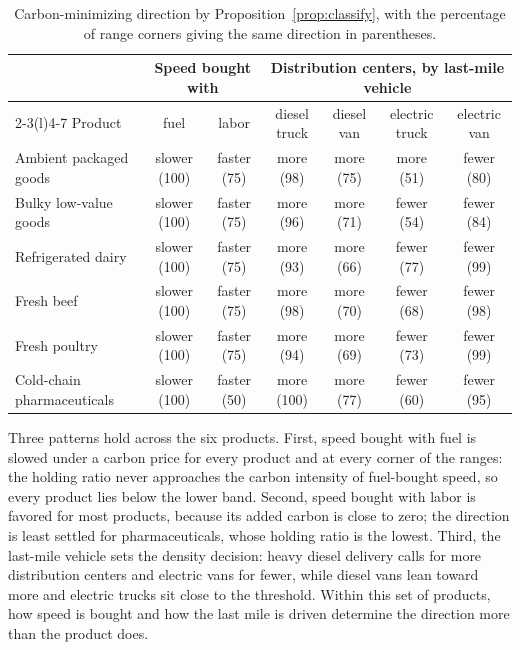 \documentclass[11pt]{article}
\theoremstyle{definition}
\theoremstyle{remark}
\theoremstyle{plain}
\begin{document}
\begin{table}[t]
\centering\small
\setlength{\tabcolsep}{4pt}
\caption{Carbon-minimizing direction by Proposition~\ref{prop:classify}, with the percentage of range corners
giving the same direction in parentheses.}
\label{tab:classify}
\begin{tabular}{@{}lcccccc@{}}
\toprule
 & \multicolumn{2}{c}{Speed bought with} & \multicolumn{4}{c}{Distribution centers, by last-mile vehicle}\\
\cmidrule(lr){2-3}\cmidrule(l){4-7}
Product & fuel & labor & diesel truck & diesel van & electric truck & electric van\\
\midrule
Ambient packaged goods     & slower (100) & faster (75) & more (98)  & more (75) & more (51)  & fewer (80)\\
Bulky low-value goods      & slower (100) & faster (75) & more (96)  & more (71) & fewer (54) & fewer (84)\\
Refrigerated dairy         & slower (100) & faster (75) & more (93)  & more (66) & fewer (77) & fewer (99)\\
Fresh beef                 & slower (100) & faster (75) & more (98)  & more (70) & fewer (68) & fewer (98)\\
Fresh poultry              & slower (100) & faster (75) & more (94)  & more (69) & fewer (73) & fewer (99)\\
Cold-chain pharmaceuticals & slower (100) & faster (50) & more (100) & more (77) & fewer (60) & fewer (95)\\
\bottomrule
\end{tabular}
\end{table}

Three patterns hold across the six products. First, speed bought with fuel is slowed under a carbon price for
every product and at every corner of the ranges: the holding ratio never approaches the carbon intensity of
fuel-bought speed, so every product lies below the lower band. Second, speed bought with labor is favored for
most products, because its added carbon is close to zero; the direction is least settled for pharmaceuticals,
whose holding ratio is the lowest. Third, the last-mile vehicle sets the density decision: heavy diesel
delivery calls for more distribution centers and electric vans for fewer, while diesel vans lean toward more
and electric trucks sit close to the threshold. Within this set of products, how speed is bought and how the
last mile is driven determine the direction more than the product does.
\end{document}
